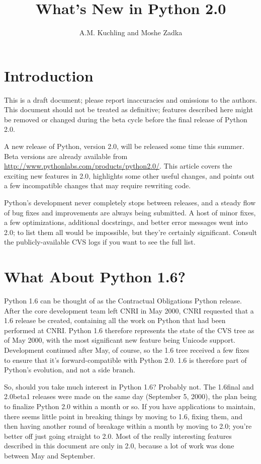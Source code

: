\documentclass{howto}
\title{What's New in Python 2.0}
\author{A.M. Kuchling and Moshe Zadka}
\begin{document}
\maketitle\tableofcontents

\section{Introduction}

{\large This is a draft document; please report inaccuracies and
omissions to the authors.  This document should not be treated as
definitive; features described here might be removed or changed during
the beta cycle before the final release of Python 2.0. 
}

A new release of Python, version 2.0, will be released some time this
summer.  Beta versions are already available from
\url{http://www.pythonlabs.com/products/python2.0/}.  This article
covers the exciting new features in 2.0, highlights some other useful
changes, and points out a few incompatible changes that may require
rewriting code.

Python's development never completely stops between releases, and a
steady flow of bug fixes and improvements are always being submitted.
A host of minor fixes, a few optimizations, additional docstrings, and
better error messages went into 2.0; to list them all would be
impossible, but they're certainly significant.  Consult the
publicly-available CVS logs if you want to see the full list.

\section{What About Python 1.6?}

Python 1.6 can be thought of as the Contractual Obligations Python
release.  After the core development team left CNRI in May 2000, CNRI
requested that a 1.6 release be created, containing all the work on
Python that had been performed at CNRI.  Python 1.6 therefore
represents the state of the CVS tree as of May 2000, with the most
significant new feature being Unicode support.  Development continued
after May, of course, so the 1.6 tree received a few fixes to ensure
that it's forward-compatible with Python 2.0.  1.6 is therefore part
of Python's evolution, and not a side branch.

So, should you take much interest in Python 1.6?  Probably not.  The
1.6final and 2.0beta1 releases were made on the same day (September 5,
2000), the plan being to finalize Python 2.0 within a month or so.  If
you have applications to maintain, there seems little point in
breaking things by moving to 1.6, fixing them, and then having another
round of breakage within a month by moving to 2.0; you're better off
just going straight to 2.0.  Most of the really interesting features
described in this document are only in 2.0, because a lot of work was
done between May and September.  
\end{document}
